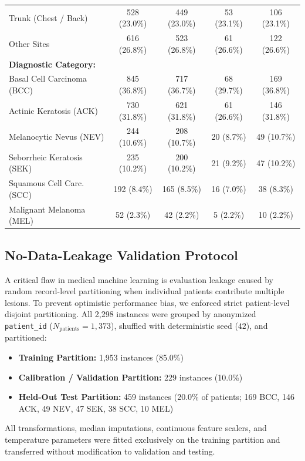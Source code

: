 \documentclass[conference]{IEEEtran}
\begin{document}
\begin{table}[h]
\begin{tabular}{@{}lcccc@{}}
\quad Trunk (Chest / Back) & 528 (23.0\%) & 449 (23.0\%) & 53 (23.1\%) & 106 (23.1\%) \\
\quad Other Sites & 616 (26.8\%) & 523 (26.8\%) & 61 (26.6\%) & 122 (26.6\%) \\
\textbf{Diagnostic Category:} & & & & \\
\quad Basal Cell Carcinoma (BCC) & 845 (36.8\%) & 717 (36.7\%) & 68 (29.7\%) & 169 (36.8\%) \\
\quad Actinic Keratosis (ACK) & 730 (31.8\%) & 621 (31.8\%) & 61 (26.6\%) & 146 (31.8\%) \\
\quad Melanocytic Nevus (NEV) & 244 (10.6\%) & 208 (10.7\%) & 20 (8.7\%) & 49 (10.7\%) \\
\quad Seborrheic Keratosis (SEK) & 235 (10.2\%) & 200 (10.2\%) & 21 (9.2\%) & 47 (10.2\%) \\
\quad Squamous Cell Carc. (SCC) & 192 (8.4\%) & 165 (8.5\%) & 16 (7.0\%) & 38 (8.3\%) \\
\quad Malignant Melanoma (MEL) & 52 (2.3\%) & 42 (2.2\%) & 5 (2.2\%) & 10 (2.2\%) \\
\bottomrule
\end{tabular}
\end{table}

\subsection{No-Data-Leakage Validation Protocol}
A critical flaw in medical machine learning is evaluation leakage caused by random record-level partitioning when individual patients contribute multiple lesions. To prevent optimistic performance bias, we enforced strict patient-level disjoint partitioning. All 2,298 instances were grouped by anonymized \texttt{patient\_id} ($N_{\text{patients}} = 1,373$), shuffled with deterministic seed ($42$), and partitioned:
\begin{itemize}
    \item \textbf{Training Partition:} 1,953 instances (85.0\%)
    \item \textbf{Calibration / Validation Partition:} 229 instances (10.0\%)
    \item \textbf{Held-Out Test Partition:} 459 instances (20.0\% of patients; 169 BCC, 146 ACK, 49 NEV, 47 SEK, 38 SCC, 10 MEL)
\end{itemize}
All transformations, median imputations, continuous feature scalers, and temperature parameters were fitted exclusively on the training partition and transferred without modification to validation and testing.
\end{document}
